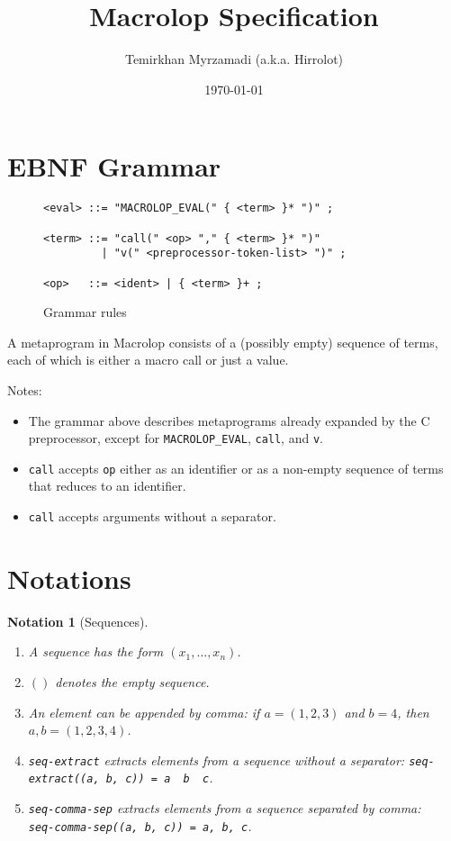 \documentclass[a4paper, 12pt]{article}
\theoremstyle{break}
\newtheorem{notation}{Notation}
\begin{document}
\title{Macrolop Specification}
\date{\today}
\author{Temirkhan Myrzamadi (a.k.a. Hirrolot)}
\maketitle

\tableofcontents

\newpage

\section{EBNF Grammar}

\begin{figure}[H]
    \caption{Grammar rules}

\begin{verbatim}
<eval> ::= "MACROLOP_EVAL(" { <term> }* ")" ;

<term> ::= "call(" <op> "," { <term> }* ")"
         | "v(" <preprocessor-token-list> ")" ;

<op>   ::= <ident> | { <term> }+ ;
\end{verbatim}

\end{figure}

A metaprogram in Macrolop consists of a (possibly empty) sequence of terms, each of which
is either a macro call or just a value.

Notes:

\begin{itemize}
    \item The grammar above describes metaprograms already expanded by the C preprocessor,
    except for \texttt{MACROLOP\_EVAL}, \texttt{call}, and \texttt{v}.
    \item \texttt{call} accepts \texttt{op} either as an identifier or as a non-empty
    sequence of terms that reduces to an identifier.
    \item \texttt{call} accepts arguments without a separator.
\end{itemize}

\section{Notations}

\begin{notation}[Sequences]
    \begin{enumerate}
        \item A sequence has the form $(x_1, \ldots, x_n)$.
        \item $()$ denotes the empty sequence.
        \item An element can be appended by comma: if $a = (1, 2, 3)$ and $b = 4$, then $a, b = (1, 2, 3, 4)$.
        \item \texttt{seq-extract} extracts elements from a sequence without a separator:
        \texttt{seq-extract((a, b, c)) = a \ b \ c}.
        \item \texttt{seq-comma-sep} extracts elements from a sequence separated by comma: \\
        \texttt{seq-comma-sep((a, b, c)) = a, b, c}.
    \end{enumerate}
\end{notation}
\end{document}
